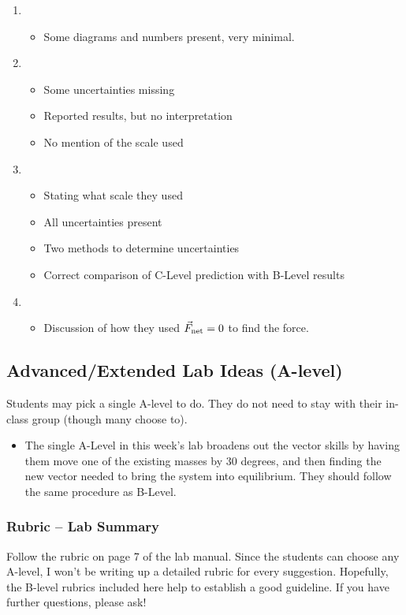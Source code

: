 \documentclass[fleqn,letterpaper]{article}
\begin{document}
\begin{enumerate}
 \item{
  \begin{itemize}
   \item{Some diagrams and numbers present, very minimal.}
  \end{itemize}
}
 \item{
  \begin{itemize}
   \item{Some uncertainties missing}
   \item{Reported results, but no interpretation}
   \item{No mention of the scale used}
  \end{itemize}
}
 \item{
  \begin{itemize}
   \item{Stating what scale they used}
   \item{All uncertainties present}
   \item{Two methods to determine uncertainties}
   \item{Correct comparison of C-Level prediction with B-Level results}
  \end{itemize}
}
 \item{
  \begin{itemize}
   \item{Discussion of how they used $\vec{F}_{\rm net} = 0$ to find the force.}
  \end{itemize}
}
\end{enumerate}


\subsection*{Advanced/Extended Lab Ideas (A-level)}

Students may pick a single A-level to do.  They do not need to stay with their in-class group (though many choose to).

\begin{itemize}
 \item{The single A-Level in this week's lab broadens out the vector skills by having them move one of the existing masses by 30 degrees, and then finding the new vector needed to bring the system into equilibrium.  They should follow the same procedure as B-Level.}
\end{itemize}

\subsubsection*{Rubric -- Lab Summary}

Follow the rubric on page 7 of the lab manual.  Since the students can choose any A-level, I won't be writing up a detailed rubric for every suggestion.  Hopefully, the B-level rubrics included here help to establish a good guideline.  If you have further questions, please ask!

\label{LastPage}
\end{document}
